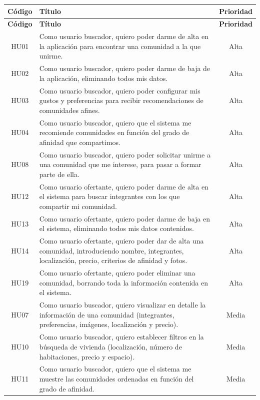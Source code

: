 \begin{longtable}{|c|p{8cm}|c|}
\hline
\textbf{Código} & \textbf{Título} & \textbf{Prioridad} \\
\hline \hline
\endfirsthead

\hline
\textbf{Código} & \textbf{Título} & \textbf{Prioridad} \\
\hline \hline
\endhead

HU01  & Como usuario buscador, quiero poder darme de alta en la aplicación para encontrar una comunidad a la que unirme. & Alta \\
\hline
HU02  & Como usuario buscador, quiero poder darme de baja de la aplicación, eliminando todos mis datos. & Alta \\
\hline
HU03 & Como usuario buscador, quiero poder configurar mis gustos y preferencias para recibir recomendaciones de comunidades afines. & Alta \\
\hline
HU04 & Como usuario buscador, quiero que el sistema me recomiende comunidades en función del grado de afinidad que compartimos. & Alta \\
\hline
HU08 & Como usuario buscador, quiero poder solicitar unirme a una comunidad que me interese, para pasar a formar parte de ella. & Alta \\
\hline
HU12 & Como usuario ofertante, quiero poder darme de alta en el sistema para buscar integrantes con los que compartir mi comunidad. & Alta \\
\hline
HU13 & Como usuario ofertante, quiero poder darme de baja en el sistema, eliminando todos mis datos contenidos. & Alta \\
\hline
HU14 & Como usuario ofertante, quiero poder dar de alta una comunidad, introduciendo nombre, integrantes, localización, precio, criterios de afinidad y fotos. & Alta \\
\hline
HU19 & Como usuario ofertante, quiero poder eliminar una comunidad, borrando toda la información contenida en el sistema. & Alta \\
\hline
HU07 & Como usuario buscador, quiero visualizar en detalle la información de una comunidad (integrantes, preferencias, imágenes, localización y precio). & Media \\
\hline
HU10 & Como usuario buscador, quiero establecer filtros en la búsqueda de vivienda (localización, número de habitaciones, precio y espacio). & Media \\
\hline
HU11 & Como usuario buscador, quiero que el sistema me muestre las comunidades ordenadas en función del grado de afinidad. & Media \\

\end{longtable}
